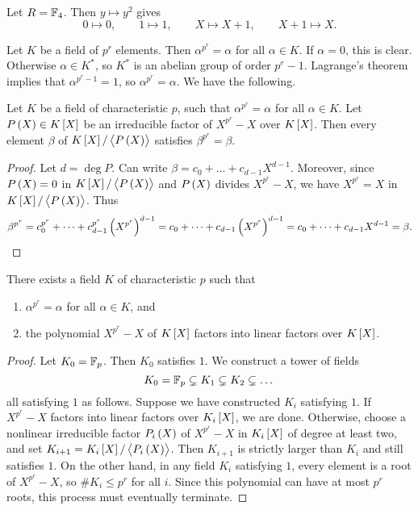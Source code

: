 \begin{example*}
Let $ R = \mathbb{F}_4 $. Then $ y \mapsto y^2 $ gives
$$ 0 \mapsto 0, \qquad 1 \mapsto 1, \qquad X \mapsto X + 1, \qquad X + 1 \mapsto X. $$
\end{example*}

Let $ K $ be a field of $ p^r $ elements. Then $ \alpha^{p^r} = \alpha $ for all $ \alpha \in K $. If $ \alpha = 0 $, this is clear. Otherwise $ \alpha \in K^* $, so $ K^* $ is an abelian group of order $ p^r - 1 $. Lagrange's theorem implies that $ \alpha^{p^r - 1} = 1 $, so $ \alpha^{p^r} = \alpha $. We have the following.

\begin{proposition}
Let $ K $ be a field of characteristic $ p $, such that $ \alpha^{p^r} = \alpha $ for all $ \alpha \in K $. Let $ P\br{X} \in K\sbr{X} $ be an irreducible factor of $ X^{p^r} - X $ over $ K\sbr{X} $. Then every element $ \beta $ of $ K\sbr{X} / \abr{P\br{X}} $ satisfies $ \beta^{p^r} = \beta $.
\end{proposition}

\begin{proof}
Let $ d = \deg P $. Can write $ \beta = c_0 + \dots + c_{d - 1}X^{d - 1} $. Moreover, since $ P\br{X} = 0 $ in $ K\sbr{X} / \abr{P\br{X}} $ and $ P\br{X} $ divides $ X^{p^r} - X $, we have $ X^{p^r} = X $ in $ K\sbr{X} / \abr{P\br{X}} $. Thus
$$ \beta^{p^r} = c_0^{p^r} + \dots + c_{d - 1}^{p^r}\br{X^{p^r}}^{d - 1} = c_0 + \dots + c_{d - 1}\br{X^{p^r}}^{d - 1} = c_0 + \dots + c_{d - 1}X^{d - 1} = \beta. $$
\end{proof}

\begin{corollary}
There exists a field $ K $ of characteristic $ p $ such that
\begin{enumerate}
\item $ \alpha^{p^r} = \alpha $ for all $ \alpha \in K $, and
\item the polynomial $ X^{p^r} - X $ of $ K\sbr{X} $ factors into linear factors over $ K\sbr{X} $.
\end{enumerate}
\end{corollary}

\begin{proof}
Let $ K_0 = \mathbb{F}_p $. Then $ K_0 $ satisfies $ 1 $. We construct a tower of fields
$$ K_0 = \mathbb{F}_p \subsetneq K_1 \subsetneq K_2 \subsetneq \dots $$
all satisfying $ 1 $ as follows. Suppose we have constructed $ K_i $ satisfying $ 1 $. If $ X^{p^r} - X $ factors into linear factors over $ K_i\sbr{X} $, we are done. Otherwise, choose a nonlinear irreducible factor $ P_i\br{X} $ of $ X^{p^r} - X $ in $ K_i\sbr{X} $ of degree at least two, and set $ K_{i + 1} = K_i\sbr{X} / \abr{P_i\br{X}} $. Then $ K_{i + 1} $ is strictly larger than $ K_i $ and still satisfies $ 1 $. On the other hand, in any field $ K_i $ satisfying $ 1 $, every element is a root of $ X^{p^r} - X $, so $ \#K_i \le p^r $ for all $ i $. Since this polynomial can have at most $ p^r $ roots, this process must eventually terminate.
\end{proof}

